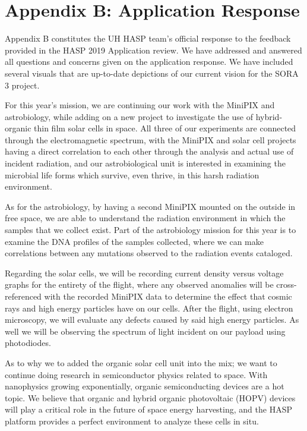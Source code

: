\newpage
\section{Appendix B: Application Response}
\label{sec:Appendix B}

Appendix B constitutes the UH HASP team's official response to the feedback provided in the HASP 2019 Application review. We have addressed and answered all questions and concerns given on the application response. We have included several visuals that are up-to-date depictions of our current vision for the SORA 3 project.

For this year’s mission, we are continuing our work with the MiniPIX and astrobiology, while adding on a new project to investigate the use of hybrid-organic thin film solar cells in space. All three of our experiments are connected through the electromagnetic spectrum, with the MiniPIX and solar cell projects having a direct correlation to each other through the analysis and actual use of incident radiation, and our astrobiological unit is interested in examining the microbial life forms which survive, even thrive, in this harsh radiation environment. 

As for the astrobiology, by having a second MiniPIX mounted on the outside in free space, we are able to understand the radiation environment in which the samples that we collect exist. Part of the astrobiology mission for this year is to examine the DNA profiles of the samples collected, where we can make correlations between any mutations observed to the radiation events cataloged. 

Regarding the solar cells, we will be recording current density versus voltage graphs for the entirety of the flight, where any observed anomalies will be cross-referenced with the recorded MiniPIX data to determine the effect that cosmic rays and high energy particles have on our cells. After the flight, using electron microscopy, we will evaluate any defects caused by said high energy particles. As well we will be observing the spectrum of light incident on our payload using photodiodes. 

As to why we to added the organic solar cell unit into the mix; we want to continue doing research in semiconductor physics related to space. With nanophysics growing exponentially, organic semiconducting devices are a hot topic. We believe that organic and hybrid organic photovoltaic (HOPV) devices will play a critical role in the future of space energy harvesting, and the HASP platform provides a perfect environment to analyze these cells in situ. 


